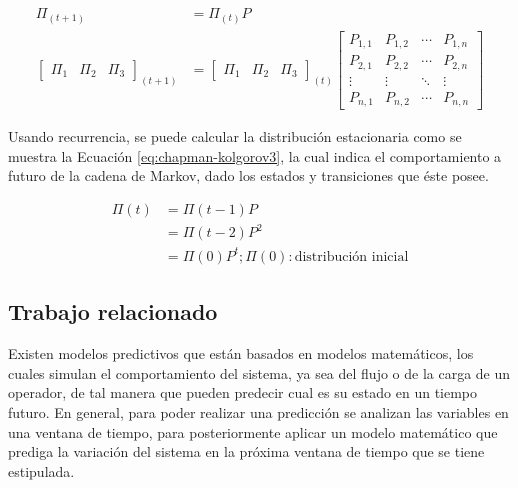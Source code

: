 \begin{equation} \label{eq:chapman-kolgorov2}
\begin{split}
	\Pi_{(t+1)} &= \Pi_{(t)}P\\
	\begin{bmatrix}
		\Pi_1 & \Pi_2 & \Pi_3
	\end{bmatrix} _{(t+1)}
	&= \begin{bmatrix}
		\Pi_1 & \Pi_2 & \Pi_3
	\end{bmatrix} _{(t)}
	\begin{bmatrix}
		P_{1,1} & P_{1,2} & \cdots & P_{1,n} \\
		P_{2,1} & P_{2,2} & \cdots & P_{2,n} \\
		\vdots  & \vdots  & \ddots & \vdots  \\
		P_{n,1} & P_{n,2} & \cdots & P_{n,n}
	\end{bmatrix}
\end{split}
\end{equation}

Usando recurrencia, se puede calcular la distribución estacionaria como se muestra la Ecuación \ref{eq:chapman-kolgorov3}, la cual indica el comportamiento a futuro de la cadena de Markov, dado los estados y transiciones que éste posee.

\begin{equation} \label{eq:chapman-kolgorov3}
\begin{split}
	\Pi (t) &= \Pi (t-1)P \\
				  &= \Pi (t-2)P^{2}\\
				  &= \Pi (0)P^{t} ; \Pi (0): \text{distribución inicial}
\end{split}
\end{equation}

\subsection{Trabajo relacionado}
\label{subSec:markovTrabajo}
Existen modelos predictivos que están basados en modelos matemáticos, los cuales simulan el comportamiento del sistema, ya sea del flujo o de la carga de un operador, de tal manera que pueden predecir cual es su estado en un tiempo futuro. En general, para poder realizar una predicción se analizan las variables en una ventana de tiempo, para posteriormente aplicar un modelo matemático que prediga la variación del sistema en la próxima ventana de tiempo que se tiene estipulada.

